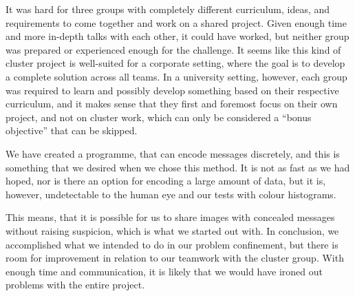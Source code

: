 It was hard for three groups with completely different curriculum, ideas, and requirements to come together and work on a shared project.
Given enough time and more in-depth talks with each other, it could have worked, but neither group was prepared or experienced enough for the challenge.
It seems like this kind of cluster project is well-suited for a corporate setting, where the goal is to develop a complete solution across all teams.
In a university setting, however, each group was required to learn and possibly develop something based on their respective curriculum, and it makes sense that they first and foremost focus on their own project, and not on cluster work, which can only be considered a ``bonus objective'' that can be skipped.

We have created a programme, that can encode messages discretely, and this is something that we desired when we chose this method. 
It is not as fast as we had hoped, nor is there an option for encoding a large amount of data, but it is, however, undetectable to the human eye and our tests with colour histograms.

This means, that it is possible for us to share images with concealed messages without raising suspicion, which is what we started out with. 
In conclusion, we accomplished what we intended to do in our problem confinement, but there is room for improvement in relation to our teamwork with the cluster group.
With enough time and communication, it is likely that we would have ironed out problems with the entire project.